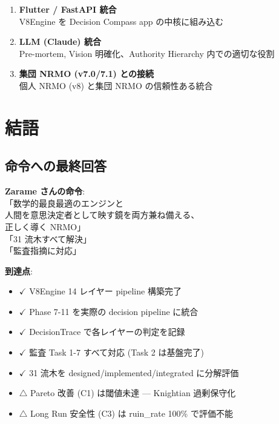\documentclass[a4paper,11pt]{report}
\begin{document}
\begin{enumerate}[leftmargin=*, start=7]
  \item \textbf{Flutter / FastAPI 統合}\\
    V8Engine を Decision Compass app の中核に組み込む
  
  \item \textbf{LLM (Claude) 統合}\\
    Pre-mortem, Vision 明確化、Authority Hierarchy 内での適切な役割
  
  \item \textbf{集団 NRMO (v7.0/7.1) との接続}\\
    個人 NRMO (v8) と集団 NRMO の信頼性ある統合
\end{enumerate}

\chapter{結語}

\section{命令への最終回答}

\begin{summary}
\textbf{Zarame さんの命令}:\\
「数学的最良最適のエンジンと\\
人間を意思決定者として映す鏡を両方兼ね備える、\\
正しく導く NRMO」\\
「31 流木すべて解決」\\
「監査指摘に対応」

\medskip

\textbf{到達点}:
\begin{itemize}[leftmargin=*]
  \item $\checkmark$ V8Engine 14 レイヤー pipeline 構築完了
  \item $\checkmark$ Phase 7-11 を実際の decision pipeline に統合
  \item $\checkmark$ DecisionTrace で各レイヤーの判定を記録
  \item $\checkmark$ 監査 Task 1-7 すべて対応 (Task 2 は基盤完了)
  \item $\checkmark$ 31 流木を designed/implemented/integrated に分解評価
  \item $\triangle$ Pareto 改善 (C1) は閾値未達 — Knightian 過剰保守化
  \item $\triangle$ Long Run 安全性 (C3) は ruin\_rate 100\% で評価不能
\end{itemize}
\end{summary}
\end{document}
